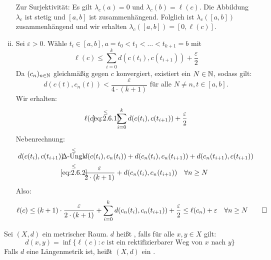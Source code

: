 \begin{beweis}
\begin{enumerate}[(i)]
		Zur Surjektivität:
		Es gilt $\lambda_c(a) = 0$ und $\lambda_c(b) = \ell(c)$.
		Die Abbildung $\lambda_c$ ist stetig und $[a,b]$ ist zusammenhängend.
		Folglich ist $\lambda_c([a,b])$ zusammenhängend und wir erhalten $\lambda_c([a,b]) = [0,\ell(c)]$. \setcounter{enumi}{6}
		\item Sei $\varepsilon >0$. 
		Wähle $t_i \in [a,b], a = t_0 < t_1 < \dots < t_{k+1} = b$ mit
		\begin{equation}
			\ell(c) \leq \sum\limits_{i=0}^{k} d(c(t_i),c(t_{i+1})) + \frac{\varepsilon}{2} \label{eq:2.6.1}
		\end{equation}
		Da $(c_n)_{n \in \mathbb{N}}$ gleichmäßig gegen $c$ konvergiert, existiert ein $N \in \mathbb{N}$, sodass gilt:
		\begin{equation}
			d(c(t),c_n(t)) < \frac{\varepsilon}{4 \cdot (k+1)} \text{ für alle } N \neq n, t \in [a,b]. \label{eq:2.6.2}
		\end{equation}
		Wir erhalten:
		\begin{equation}
			\ell(c) \stack{\leq}{\eqref{eq:2.6.1}} \sum\limits_{i=0}^{k} d(c(t_i),c(t_{i+1})) + \frac{\varepsilon}{2}
		\end{equation}
		Nebenrechnung:
		\begin{align*}
			d(c(t_i),c(t_{i+1})) &\stack{\leq}{\Delta\text{-Ungl.}} d(c(t_i),c_n(t_i)) + d(c_n(t_i),c_n(t_{i+1})) + d(c_n(t_{i+1}),c(t_{i+1})) \\
			&\stack{\leq}{\eqref{eq:2.6.2}} \frac{\varepsilon}{2 \cdot (k+1)} + d(c_n(t_i),c_n(t_{i+1})) \quad \forall n \geq N
		\end{align*}
		Also:
		\[
			\ell(c) \leq (k+1) \cdot \frac{\varepsilon}{2 \cdot (k+1)} + \sum\limits_{i=0}^{k} d(c_n(t_i),c_n(t_{i+1})) + \frac{\varepsilon}{2} \leq \ell(c_n) + \varepsilon \quad \forall n \geq N \qedhere
		\]
	\end{enumerate}
\end{beweis}

\begin{definition}
\label{def:2.7}
	Sei $(X,d)$ ein metrischer Raum.
	$d$ heißt , falls für alle $x,y \in X$ gilt:
	\[
		d(x,y) = \inf \{ \ell(c) : c \text{ ist ein rektifizierbarer Weg von } x \text{ nach } y \}
	\]
	Falls $d$ eine Längenmetrik ist, heißt $(X,d)$ ein .
\end{definition}

